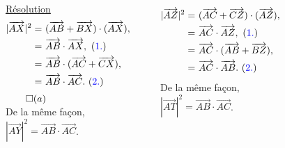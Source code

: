 \documentclass[10pt]{beamer}
\newcommand{\vect}[1] {
  \overrightarrow{#1}}
\begin{document}
{\begin{columns}[t]
		
		\centering
		
		\underline{Résolution}\\ \flushleft
		\vspace{-3mm}
		\begin{align*}
		|\vect{AX}|^2=& \ (\vect{AB}+\vect{BX})\cdot(\vect{AX}), \\
			     =& \ \vect{AB}\cdot\vect{AX}, \text{ (\textcolor{blue}{1.})} \\
			     =& \ \vect{AB}\cdot(\vect{AC}+\vect{CX}), \\
			     =& \ \vect{AB}\cdot\vect{AC}. \text{ (\textcolor{blue}{2.})}
		\end{align*}
		\hfill $\qed(a)$ \\
		De la même façon, \\ \smallskip
		$|\vect{AY}|^2=\vect{AB}\cdot\vect{AC}$. \\
		\centering\noindent\rule{2cm}{0.4pt}\flushleft
		\vspace{-3mm}
		\begin{align*}
		 |\vect{AZ}|^2=& \ (\vect{AC}+\vect{CZ})\cdot(\vect{AZ}), \\
			     =& \ \vect{AC}\cdot\vect{AZ}, \text{ (\textcolor{blue}{1.})} \\
			     =& \ \vect{AC}\cdot(\vect{AB}+\vect{BZ}), \\
			     =& \ \vect{AC}\cdot\vect{AB}. \text{ (\textcolor{blue}{2.})}
		\end{align*}
		De la même façon, \\ \smallskip
		$|\vect{AT}|^2=\vect{AB}\cdot\vect{AC}$. \\

   
	   \end{columns}
    
    
    
    }
\end{document}
